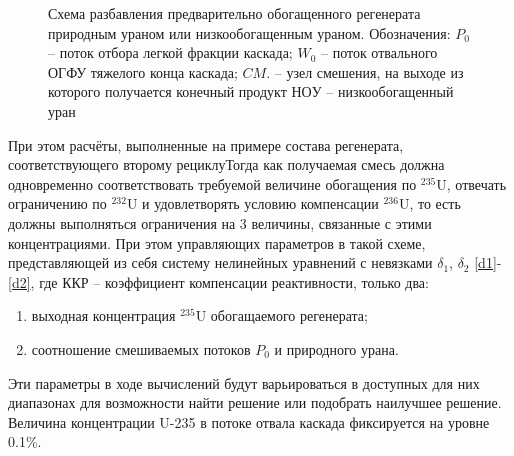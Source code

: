 \begin{figure}[ht]
  \caption{Схема разбавления предварительно обогащенного регенерата природным ураном или низкообогащенным ураном. Обозначения: $P_0$ -- поток отбора легкой фракции каскада; $W_0$ -- поток отвального ОГФУ тяжелого конца каскада; $CM.$ -- узел смешения, на выходе из которого получается конечный продукт $НОУ$ -- низкообогащенный уран}\label{o1}
\end{figure}

При этом расчёты, выполненные на примере состава регенерата, соответствующего второму рециклуТогда как получаемая смесь должна одновременно соответствовать требуемой величине обогащения по $^{235}$U, отвечать ограничению по $^{232}$U и удовлетворять условию компенсации $^{236}$U, то есть должны выполняться ограничения на 3 величины, связанные с этими концентрациями. При этом управляющих параметров в такой схеме, представляющей из себя систему нелинейных уравнений с невязками $\delta_1$, $\delta_2$ \ref{d1}-\ref{d2}, где ККР -- коэффициент компенсации реактивности, только два:

\begin{enumerate}
  \item выходная концентрация $^{235}$U обогащаемого регенерата;
  \item соотношение смешиваемых потоков $P_0$ и природного урана.
\end{enumerate}

Эти параметры в ходе вычислений будут варьироваться в доступных для них диапазонах для возможности найти решение или подобрать наилучшее решение. Величина концентрации U-235 в потоке отвала каскада фиксируется на уровне 0.1\%. 

